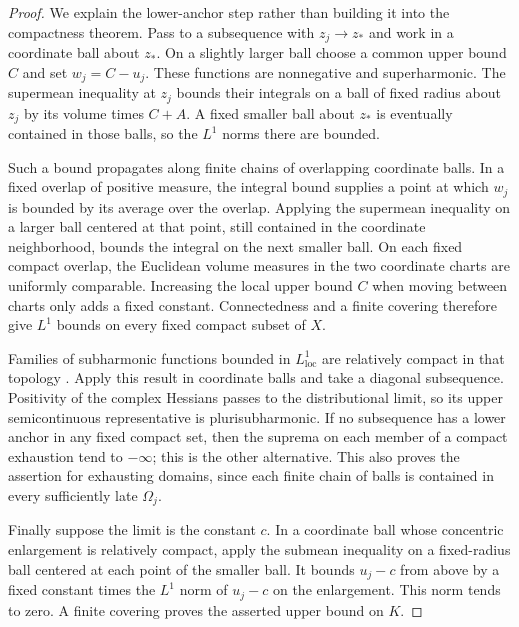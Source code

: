 \documentclass[11pt]{article}
\theoremstyle{definition}
\theoremstyle{remark}
\numberwithin{equation}{section}
\begin{document}
\begin{proof}
We explain the lower-anchor step rather than building it into the
compactness theorem.  Pass to a subsequence with $z_j\to z_*$ and
work in a coordinate ball about $z_*$.  On a slightly larger ball
choose a common upper bound $C$ and set $w_j=C-u_j$.
These functions are nonnegative and superharmonic.  The supermean
inequality at $z_j$ bounds their integrals on a ball of fixed radius
about $z_j$ by its volume times $C+A$.  A fixed smaller ball about
$z_*$ is eventually contained in those balls, so the $L^1$ norms
there are bounded.

Such a bound propagates along finite chains of overlapping coordinate
balls.  In a fixed overlap of positive measure, the integral bound
supplies a point at which $w_j$ is bounded by its average over the
overlap.  Applying the supermean inequality on a larger ball centered
at that point, still contained in the coordinate neighborhood, bounds
the integral on the next smaller ball.  On each fixed compact overlap, the Euclidean volume measures in
the two coordinate charts are uniformly comparable.  Increasing the
local upper bound $C$ when moving between charts only adds a fixed constant.
Connectedness and a finite covering therefore give $L^1$ bounds on
every fixed compact subset of $X$.

Families of subharmonic functions bounded in $L^1_{\mathrm{loc}}$
are relatively compact in that topology \cite[Chapter~I, Proposition~4.21]{DemaillyBook}.
Apply this result in coordinate balls and take a diagonal subsequence.
Positivity of the complex Hessians passes to the distributional
limit, so its upper semicontinuous representative is
plurisubharmonic.  If no subsequence has a lower anchor in any fixed
compact set, then the suprema on each member of a compact exhaustion
tend to $-\infty$; this is the other alternative.  This also proves
the assertion for exhausting domains, since each finite chain of
balls is contained in every sufficiently late $\Omega_j$.

Finally suppose the limit is the constant $c$.  In a coordinate ball
whose concentric enlargement is relatively compact, apply the
submean inequality on a fixed-radius ball centered at each point of
the smaller ball.  It bounds $u_j-c$ from above by a fixed constant
times the $L^1$ norm of $u_j-c$ on the enlargement.  This norm tends
to zero.  A finite covering proves the asserted upper bound on $K$.
\end{proof}
\end{document}
